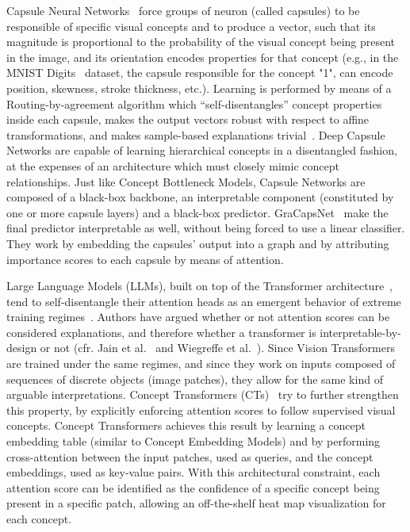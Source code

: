 Capsule Neural Networks~\cite{sabour2017dynamic} force groups of neuron (called capsules) to be responsible of specific visual concepts and to produce a vector, such that its magnitude is proportional to the probability of the visual concept being present in the image, and its orientation encodes properties for that concept (e.g., in the MNIST Digits~\cite{lecun1998mnist} dataset, the capsule responsible for the concept "1", can encode position, skewness, stroke thickness, etc.). Learning is performed by means of a Routing-by-agreement algorithm which  ``self-disentangles'' concept properties inside each capsule, makes the output vectors robust with respect to affine transformations, and makes sample-based explanations trivial~\cite{shahroudnejad2018improved}. Deep Capsule Networks are capable of learning hierarchical concepts in a disentangled fashion, at the expenses of an architecture which must closely mimic concept relationships.
Just like Concept Bottleneck Models, Capsule Networks are composed of a black-box backbone, an interpretable component (constituted by one or more capsule layers) and a black-box predictor. GraCapsNet~\cite{gu2021interpretable} make the final predictor interpretable as well, without being forced to use a linear classifier. They work by embedding the capsules' output into a graph and by attributing importance scores to each capsule by means of attention.

Large Language Models (LLMs), built on top of the Transformer architecture~\cite{vaswani2017attention}, tend to self-disentangle their attention heads as an emergent behavior of extreme training regimes~\cite{rogers2020primer}. Authors have argued whether or not attention scores can be considered explanations, and therefore whether a transformer is interpretable-by-design or not (cfr. Jain et al.~\cite{jain2019attention} and Wiegreffe et al.~\cite{wiegreffe2019attention}). Since Vision Transformers are trained under the same regimes, and since they work on inputs composed of sequences of discrete objects (image patches), they allow for the same kind of arguable interpretations. Concept Transformers (CTs)~\cite{rigotti2021attention} try to further strengthen this property, by explicitly enforcing attention scores to follow supervised visual concepts. Concept Transformers achieves this result by learning a concept embedding table (similar to Concept Embedding Models) and by performing cross-attention between the input patches, used as queries, and the concept embeddings, used as key-value pairs. With this architectural constraint, each attention score can be identified as the confidence of a specific concept being present in a specific patch, allowing an off-the-shelf heat map visualization for each concept.

